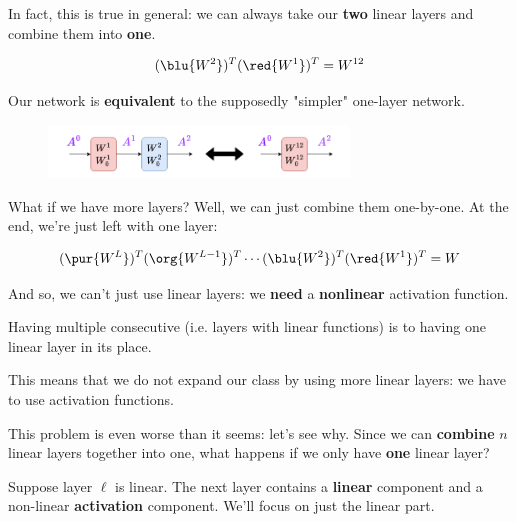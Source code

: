         In fact, this is true in general: we can always take our \textbf{two} linear layers and combine them into \textbf{one}.
        
        \begin{equation}
            (\blu{W^2})^T (\red{W^1})^T
            = W^{12}
        \end{equation}
        
        Our network is \textbf{equivalent} to the supposedly "simpler" one-layer network.
    
        \begin{figure}[H]
            \centering
            \includegraphics[width=80mm,scale=0.4]{images/nn_images/equivalent_networks.png}
        \end{figure}
        
        What if we have more layers? Well, we can just combine them one-by-one. At the end, we're just left with one layer:
        
        \begin{equation}
            (\pur{W^L})^T (\org{ {W^{L-1}} })^T \cdots (\blu{W^2})^T (\red{W^1})^T
            = W
        \end{equation}
        
        And so, we can't just use linear layers: we \textbf{need} a \textbf{nonlinear} activation function.\\
        
        \begin{concept}
            Having multiple consecutive  (i.e. layers with linear  functions) is  to having one linear layer in its place.
            
            This means that we do not expand our  class by using more linear layers: we have to use  activation functions.
        \end{concept}

        This problem is even worse than it seems: let's see why. Since we can \textbf{combine} $n$ linear layers together into one, what happens if we only have \textbf{one} linear layer?

        Suppose layer $\ell$ is linear. The next layer contains a \textbf{linear} component and a non-linear \textbf{activation} component. We'll focus on just the linear part.


